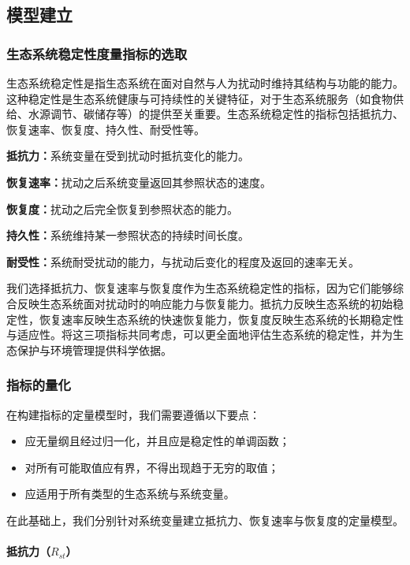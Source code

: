 \documentclass[11pt,a4paper]{ctexart}
\begin{document}
\subsection{模型建立}

\subsubsection{生态系统稳定性度量指标的选取}

生态系统稳定性是指生态系统在面对自然与人为扰动时维持其结构与功能的能力。这种稳定性是生态系统健康与可持续性的关键特征，对于生态系统服务（如食物供给、水源调节、碳储存等）的提供至关重要。生态系统稳定性的指标包括抵抗力、恢复速率、恢复度、持久性、耐受性等\cite{18}。

\textbf{抵抗力：}系统变量在受到扰动时抵抗变化的能力。

\textbf{恢复速率：}扰动之后系统变量返回其参照状态的速度。

\textbf{恢复度：}扰动之后完全恢复到参照状态的能力。

\textbf{持久性：}系统维持某一参照状态的持续时间长度。

\textbf{耐受性：}系统耐受扰动的能力，与扰动后变化的程度及返回的速率无关。

我们选择抵抗力、恢复速率与恢复度作为生态系统稳定性的指标，因为它们能够综合反映生态系统面对扰动时的响应能力与恢复能力。抵抗力反映生态系统的初始稳定性，恢复速率反映生态系统的快速恢复能力，恢复度反映生态系统的长期稳定性与适应性。将这三项指标共同考虑，可以更全面地评估生态系统的稳定性，并为生态保护与环境管理提供科学依据。

\subsubsection{指标的量化}

在构建指标的定量模型时，我们需要遵循以下要点\cite{19}：

\begin{itemize}
\item[(a)] 应无量纲且经过归一化，并且应是稳定性的单调函数；
\item[(b)] 对所有可能取值应有界，不得出现趋于无穷的取值；
\item[(c)] 应适用于所有类型的生态系统与系统变量。
\end{itemize}

在此基础上，我们分别针对系统变量建立抵抗力、恢复速率与恢复度的定量模型\cite{18}。

\paragraph{抵抗力（$R_{st}$）}
\end{document}
